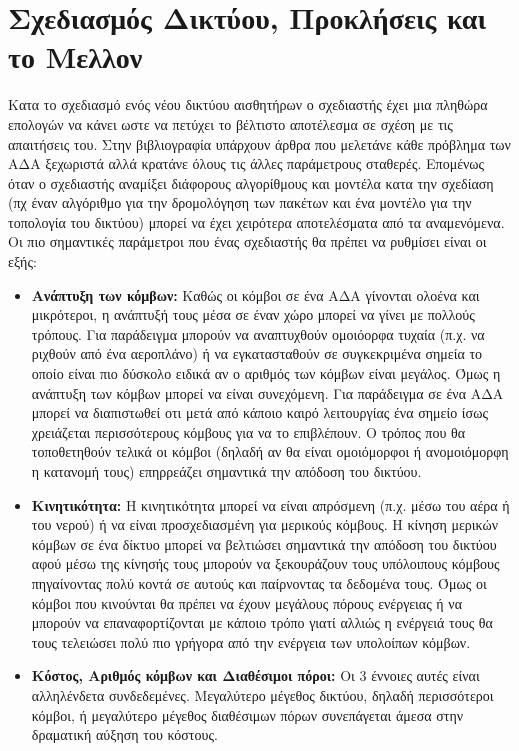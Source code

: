 \section{Σχεδιασμός Δικτύου, Προκλήσεις και το Μελλον}\label{sc:wsn_design}
Κατα το σχεδιασμό ενός νέου δικτύου αισθητήρων ο σχεδιαστής έχει μια πληθώρα επολογών να κάνει ωστε να πετύχει το βέλτιστο αποτέλεσμα σε σχέση με τις απαιτήσεις
του.
Στην βιβλιογραφία υπάρχουν άρθρα που μελετάνε κάθε πρόβλημα των ΑΔΑ ξεχωριστά αλλά κρατάνε όλους τις άλλες παράμετρους σταθερές.
Επομένως όταν ο σχεδιαστής αναμίξει διάφορους αλγορίθμους και μοντέλα κατα την σχεδίαση (πχ έναν αλγόριθμο για την δρομολόγηση των πακέτων και ένα μοντέλο για την
τοπολογία του δικτύου) μπορεί να έχει χειρότερα αποτελέσματα από τα αναμενόμενα.
Οι πιο σημαντικές παράμετροι που ένας σχεδιαστής θα πρέπει να ρυθμίσει είναι οι εξής:
\begin{itemize}
\item \textbf{Ανάπτυξη των κόμβων:} Καθώς οι κόμβοι σε ένα ΑΔΑ γίνονται ολοένα και μικρότεροι, η ανάπτυξή τους μέσα σε έναν χώρο μπορεί να γίνει με πολλούς τρόπους.
Για παράδειγμα μπορούν να αναπτυχθούν ομοιόορφα τυχαία (π.χ. να ριχθούν από ένα αεροπλάνο) ή να εγκατασταθούν σε συγκεκριμένα σημεία το οποίο είναι πιο
δύσκολο ειδικά αν ο αριθμός των κόμβων είναι μεγάλος.
Όμως η ανάπτυξη των κόμβων μπορεί να είναι συνεχόμενη.
Για παράδειγμα σε ένα ΑΔΑ μπορεί να διαπιστωθεί οτι μετά από κάποιο καιρό λειτουργίας ένα σημείο ίσως χρειάζεται περισσότερους κόμβους για να το επιβλέπουν.
Ο τρόπος που θα τοποθετηθούν τελικά οι κόμβοι (δηλαδή αν θα είναι ομοιόμορφοι ή ανομοιόμορφη η κατανομή τους) επηρρεάζει σημαντικά την απόδοση του δικτύου.
\item \textbf{Κινητικότητα:} Η κινητικότητα μπορεί να είναι απρόσμενη (π.χ. μέσω του αέρα ή του νερού) ή να είναι προσχεδιασμένη για μερικούς κόμβους.
Η κίνηση μερικών κόμβων σε ένα δίκτυο μπορεί να βελτιώσει σημαντικά την απόδοση του δικτύου αφού μέσω της κίνησής τους μπορούν να ξεκουράζουν τους υπόλοιπους κόμβους
πηγαίνοντας πολύ κοντά σε αυτούς και παίρνοντας τα δεδομένα τους.
Όμως οι κόμβοι που κινούνται θα πρέπει να έχουν μεγάλους πόρους ενέργειας ή να μπορούν να επαναφορτίζονται με κάποιο τρόπο γιατί αλλιώς η ενέργειά τους θα τους
τελειώσει πολύ πιο γρήγορα από την ενέργεια των υπολοίπων κόμβων.
\item \textbf{Κόστος, Αριθμός κόμβων και Διαθέσιμοι πόροι:} Οι 3 έννοιες αυτές είναι αλληλένδετα συνδεδεμένες.
Μεγαλύτερο μέγεθος δικτύου, δηλαδή περισσότεροι κόμβοι, ή μεγαλύτερο μέγεθος διαθέσιμων πόρων συνεπάγεται άμεσα στην δραματική αύξηση του κόστους.

\end{itemize}
